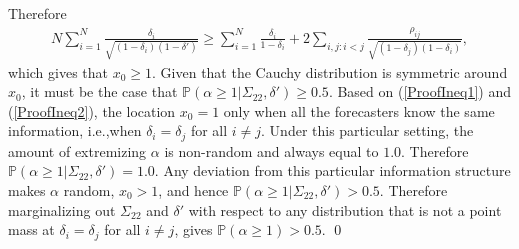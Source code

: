 \documentclass[11pt]{article}
\renewcommand{\P}{\mathbb{P}}
\theoremstyle{definition}
\theoremstyle{definition}
\def\P{{\mathbb P}}
\begin{document}
Therefore 
\begin{align*}
N \sum_{i=1}^N \frac{\delta_i}{\sqrt{(1-\delta_i)(1-\delta')}} \geq \sum_{i=1}^N \frac{\delta_i}{1-\delta_i} + 2 \sum_{i,j: i<j} \frac{\rho_{ij}}{\sqrt{(1-\delta_j)(1-\delta_i)}},
\end{align*}
which gives that $x_0 \geq 1$. Given that the Cauchy distribution is symmetric around $x_0$, it must be the case that $\P(\alpha \geq 1 | \Sigma_{22}, \delta') \geq 0.5$. Based on (\ref{ProofIneq1}) and (\ref{ProofIneq2}), the location $x_0 = 1$ only when all the forecasters know the same information, i.e.,when $\delta_i = \delta_j$ for all $i \neq j$. Under this particular setting, the amount of extremizing $\alpha$ is non-random and always equal to $1.0$. Therefore $\P(\alpha \geq 1 | \Sigma_{22}, \delta') = 1.0$.  Any deviation from this particular information structure makes $\alpha$ random, $x_0 > 1$, and hence $\P(\alpha \geq 1 | \Sigma_{22}, \delta') > 0.5$. Therefore marginalizing out $\Sigma_{22}$ and $\delta'$ with respect to any distribution that is not a point mass at $\delta_i = \delta_j$ for all $i \neq j$, gives $\P(\alpha \geq 1) > 0.5$. \qed
\end{document}
